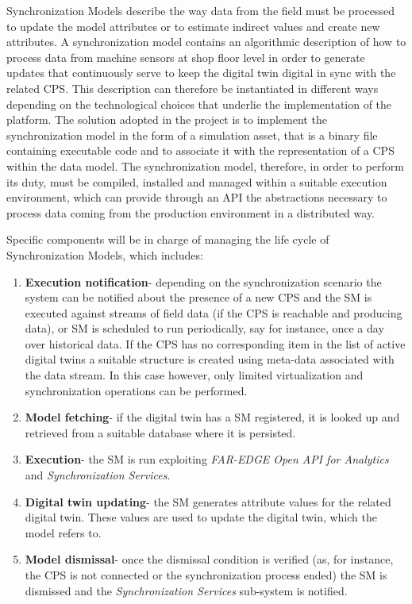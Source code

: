 Synchronization Models describe the way data from the field must be processed to update the model attributes or to estimate indirect values and create new attributes. 
A synchronization model contains an algorithmic description of how to process data from machine sensors at shop floor level in order to generate updates that continuously serve to keep the digital twin digital in sync with the related CPS. 
This description can therefore be instantiated in different ways depending on the technological choices that underlie the implementation of the platform. 
The solution adopted in the project is to implement the synchronization model in the form of a simulation asset, that is a binary file containing executable code and to associate it with the representation of a CPS within the data model. The synchronization model, therefore, in order to perform its duty, must be compiled, installed and managed within a suitable execution environment, which can provide through an API the abstractions necessary to process data coming from the production environment in a distributed way.  

Specific components will be in charge of managing the life cycle of Synchronization Models, which includes: 
\begin{enumerate}
\item \textbf{Execution notification}- depending on the synchronization scenario the system can be notified about the presence of a new CPS and the SM is executed against streams of field data (if the CPS is reachable and producing data), or SM is scheduled to run periodically, say for instance, once a day over historical data. If the CPS has no corresponding item in the list of active digital twins a suitable structure is created using meta-data associated with the data stream. In this case however, only limited virtualization and synchronization operations can be performed.
\item \textbf{Model fetching}- if the digital twin has a SM registered, it is looked up and retrieved from a suitable database where it is persisted. 
\item \textbf{Execution}- the SM is run exploiting \textit{FAR-EDGE Open API for Analytics} and\textit{ Synchronization Services}.
\item \textbf{Digital twin updating}- the SM generates attribute values for the related digital twin. These values are used to update the digital twin, which the model refers to.
\item \textbf{Model dismissal}- once the dismissal condition is verified (as, for instance, the CPS is not connected or the synchronization process ended) the SM is dismissed and the \textit{Synchronization Services} sub-system is notified.
\end{enumerate}



